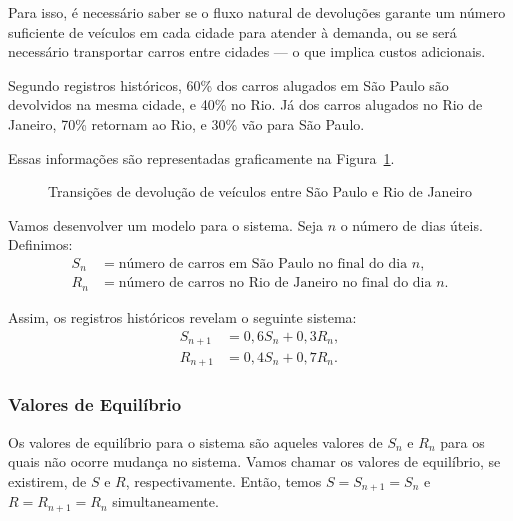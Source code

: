\documentclass{article}
\begin{document}
Para isso, é necessário saber se o fluxo natural de devoluções garante
um número suficiente de veículos em cada cidade para atender à demanda,
ou se será necessário transportar carros entre cidades — o que implica
custos adicionais.

Segundo registros históricos, 60\% dos carros alugados em São Paulo são
devolvidos na mesma cidade, e 40\% no Rio. Já dos carros alugados no
Rio de Janeiro, 70\% retornam ao Rio, e 30\% vão para São Paulo.

\bigskip

Essas informações são representadas graficamente na
Figura~\ref{fig:transicoes}.


\begin{figure}[h!]
\centering
{}
\caption{Transições de devolução de veículos entre São Paulo e Rio de
  Janeiro}
\label{fig:transicoes}
\end{figure}

Vamos desenvolver um modelo para o sistema. Seja \( n \) o número de
dias úteis. Definimos:
\begin{align*}
  S_n &= \text{número de carros em São Paulo no final do dia } n, \\
  R_n &= \text{número de carros no Rio de Janeiro no final do dia } n.
\end{align*}

Assim, os registros históricos revelam o seguinte sistema:
\begin{align*}
S_{n+1} &= 0{,}6 S_n + 0{,}3 R_n, \\
R_{n+1} &= 0{,}4 S_n + 0{,}7 R_n.
\end{align*}

\subsubsection{Valores de Equilíbrio}

Os valores de equilíbrio para o sistema são aqueles valores de
\( S_n \) e \( R_n \) para os quais não ocorre mudança no
sistema. Vamos chamar os valores de equilíbrio, se existirem, de
\( S \) e \( R \), respectivamente. Então, temos
\( S = S_{n+1} = S_n \) e \( R = R_{n+1} = R_n \) simultaneamente.
\end{document}
